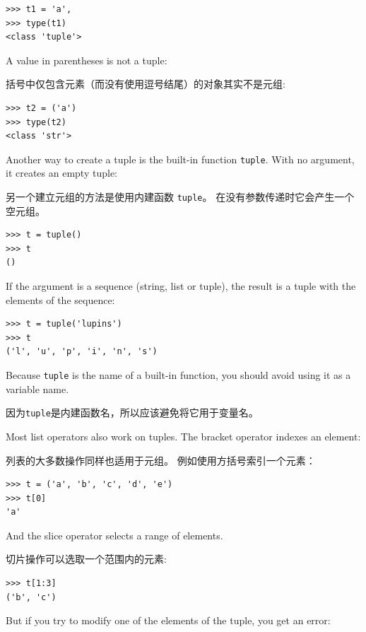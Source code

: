 
\begin{lstlisting}
>>> t1 = 'a',
>>> type(t1)
<class 'tuple'>
\end{lstlisting}
%
A value in parentheses is not a tuple:

括号中仅包含元素（而没有使用逗号结尾）的对象其实不是元组:

\begin{lstlisting}
>>> t2 = ('a')
>>> type(t2)
<class 'str'>
\end{lstlisting}
%
Another way to create a tuple is the built-in function {\tt tuple}.
With no argument, it creates an empty tuple:

另一个建立元组的方法是使用内建函数 \lstinline{tuple}。 在没有参数传递时它会产生一个空元组。

\begin{lstlisting}
>>> t = tuple()
>>> t
()
\end{lstlisting}

%
If the argument is a sequence (string, list or tuple), the result
is a tuple with the elements of the sequence:



\begin{verbatim}
>>> t = tuple('lupins')
>>> t
('l', 'u', 'p', 'i', 'n', 's')
\end{verbatim}
%
Because {\tt tuple} is the name of a built-in function, you should
avoid using it as a variable name.

因为\lstinline{tuple}是内建函数名，所以应该避免将它用于变量名。


Most list operators also work on tuples.  The bracket operator
indexes an element:

列表的大多数操作同样也适用于元组。 例如使用方括号索引一个元素：


\begin{lstlisting}
>>> t = ('a', 'b', 'c', 'd', 'e')
>>> t[0]
'a'
\end{lstlisting}
%
And the slice operator selects a range of elements.

切片操作可以选取一个范围内的元素:

\begin{lstlisting}
>>> t[1:3]
('b', 'c')
\end{lstlisting}
%
But if you try to modify one of the elements of the tuple, you get
an error:

